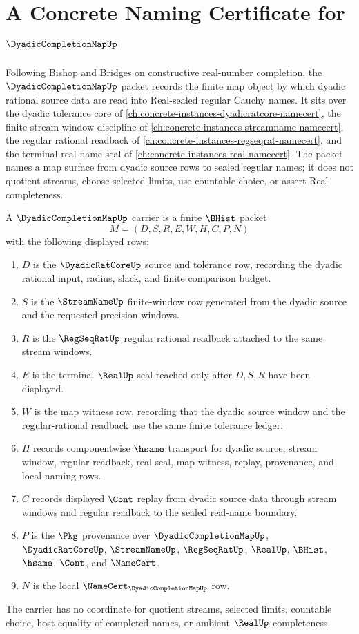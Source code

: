 \chapter{A Concrete Naming Certificate for $\DyadicCompletionMapUp$}
\label{ch:concrete-instances-dyadic-completion-map-namecert}

Following Bishop and Bridges on constructive real-number completion, the $\DyadicCompletionMapUp$ packet records the finite map object by which dyadic rational source data are read into Real-sealed regular Cauchy names. It sits over the dyadic tolerance core of \autoref{ch:concrete-instances-dyadicratcore-namecert}, the finite stream-window discipline of \autoref{ch:concrete-instances-streamname-namecert}, the regular rational readback of \autoref{ch:concrete-instances-regseqrat-namecert}, and the terminal real-name seal of \autoref{ch:concrete-instances-real-namecert}. The packet names a map surface from dyadic source rows to sealed regular names; it does not quotient streams, choose selected limits, use countable choice, or assert Real completeness.

\begin{definition}
\label{def:dyadic-completion-map-carrier}
A $\DyadicCompletionMapUp$ carrier is a finite $\BHist$ packet
$$
M=(D,S,R,E,W,H,C,P,N)
$$
with the following displayed rows:
\begin{enumerate}
\item $D$ is the $\DyadicRatCoreUp$ source and tolerance row, recording the dyadic rational input, radius, slack, and finite comparison budget.
\item $S$ is the $\StreamNameUp$ finite-window row generated from the dyadic source and the requested precision windows.
\item $R$ is the $\RegSeqRatUp$ regular rational readback attached to the same stream windows.
\item $E$ is the terminal $\RealUp$ seal reached only after $D,S,R$ have been displayed.
\item $W$ is the map witness row, recording that the dyadic source window and the regular-rational readback use the same finite tolerance ledger.
\item $H$ records componentwise $\hsame$ transport for dyadic source, stream window, regular readback, real seal, map witness, replay, provenance, and local naming rows.
\item $C$ records displayed $\Cont$ replay from dyadic source data through stream windows and regular readback to the sealed real-name boundary.
\item $P$ is the $\Pkg$ provenance over $\DyadicCompletionMapUp$, $\DyadicRatCoreUp$, $\StreamNameUp$, $\RegSeqRatUp$, $\RealUp$, $\BHist$, $\hsame$, $\Cont$, and $\NameCert$.
\item $N$ is the local $\NameCert_{\DyadicCompletionMapUp}$ row.
\end{enumerate}
The carrier has no coordinate for quotient streams, selected limits, countable choice, host equality of completed names, or ambient $\RealUp$ completeness.
\end{definition}

